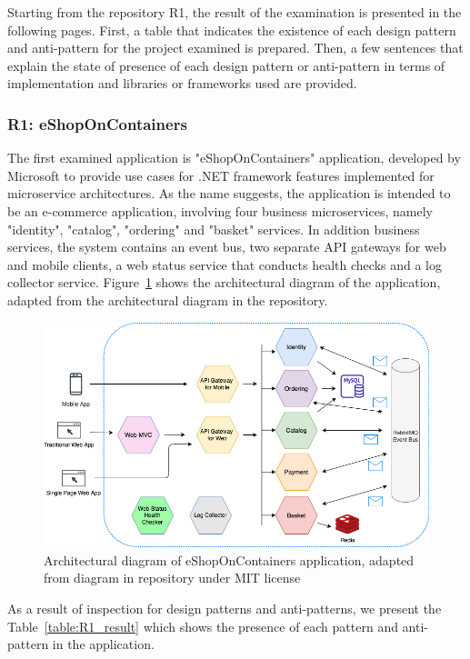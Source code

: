 \documentclass{Configuration_Files/PoliMi3i_thesis}
\begin{document}
Starting from the repository R1, the result of the examination is presented in the following pages.
First, a table that indicates the existence of each design pattern and anti-pattern for the project examined is prepared.
Then, a few sentences that explain the state of presence of each design pattern or anti-pattern in terms of implementation and libraries or frameworks used are provided. 

\subsubsection{R1: eShopOnContainers}
\label{subsubsec:R1}

The first examined application is "eShopOnContainers" application, developed by Microsoft to provide use cases for .NET framework features implemented for microservice architectures.
As the name suggests, the application is intended to be an e-commerce application, involving four business microservices, namely "identity", "catalog", "ordering" and "basket" services.
In addition business services, the system contains an event bus, two separate API gateways for web and mobile clients, a web status service that conducts health checks and a log collector service.
Figure~\ref{fig:R1_arch} shows the architectural diagram of the application, adapted from the architectural diagram in the repository.

\begin{figure}[H]
\centering
\includegraphics[width=1\textwidth]{myImages/R1.png}
\caption{Architectural diagram of eShopOnContainers application, adapted from diagram in repository under MIT license}
\label{fig:R1_arch}
\end{figure}

As a result of inspection for design patterns and anti-patterns, we present the Table~\ref{table:R1_result} which shows the presence of each pattern and anti-pattern in the application.
\end{document}
